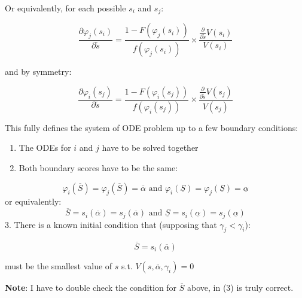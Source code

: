 \documentclass[
]{article}
\providecommand{\tightlist}{%
  \setlength{\itemsep}{0pt}\setlength{\parskip}{0pt}}
\begin{document}
Or equivalently, for each possible \(s_{i}\) and \(s_{j}\):

\[
 \frac{\partial \varphi_j(s_{i})}{\partial \tilde{s}} = \frac{1 - F(\varphi_j(s_{i})) }{f(\varphi_j(s_{i}))} \times \frac{\frac{\partial}{\partial \tilde{s}}V(s_{i})}{V(s_{i})}
\]

and by symmetry:

\[
 \frac{\partial \varphi_i(s_{j})}{\partial \tilde{s}} = \frac{1 - F(\varphi_i(s_{j})) }{f(\varphi_i(s_{j}))} \times \frac{\frac{\partial}{\partial \tilde{s}}V(s_{j})}{V(s_{j})}
\]

This fully defines the system of ODE problem up to a few boundary conditions:

\begin{enumerate}
\def\labelenumi{\arabic{enumi}.}
\tightlist
\item
  The ODEs for \(i\) and \(j\) have to be solved together
\item
  Both boundary scores have to be the same:
\end{enumerate}

\[
\varphi_i(\overline{S}) = \varphi_j(\overline{S}) = \overline{\alpha} \text{ and } \varphi_i(\underline{S}) = \varphi_j(\underline{S}) = \underline{\alpha}
\] or equivalently: \[ 
\overline{S} = s_{i}(\overline{\alpha}) = s_{j}(\overline{\alpha}) \text{  and  } \underline{S} = s_{i}(\underline{\alpha}) = s_{j}(\underline{\alpha})
\] 3. There is a known initial condition that (supposing that
\(\gamma_j < \gamma_i\)):

\[\overline{S} = s_{i}(\overline{\alpha})\]

must be the smallest value of \(s\) s.t.
\(V(s , \overline{\alpha}, \gamma_i) = 0\)

\textbf{Note}: I have to double check the condition for \(\overline{S}\)
above, in (3) is truly correct.
\end{document}
